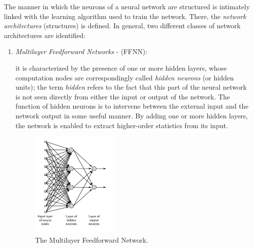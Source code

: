 The manner in which the neurons of a neural network are structured is intimately linked with the learning algorithm used to train the network. %
There, the \textit{network architectures} (structures) is defined.
In general, two different classes of network architectures are identified:
\begin{enumerate}
	
	
	
	\item \textit{Multilayer Feedforward Networks} - (FFNN):
	
	it is characterized by the presence of one or more hidden layers, whose computation nodes are correspondingly called \textit{hidden neurons} (or hidden units);
	the term \textit{hidden} refers to the fact that this part of the neural network is not seen directly from either the input or output of the network. 
	The function of hidden neurons is to intervene between the external input and the network output in some useful manner. By adding one or more hidden layers, the network is enabled to extract higher-order statistics from its input. 
	
	
	\begin{figure}
		\centering
		\includegraphics[width=0.4\textwidth]{img/MLP}
		\caption{The Multilayer Feedforward Network.}
	\end{figure}
	

\end{enumerate}
